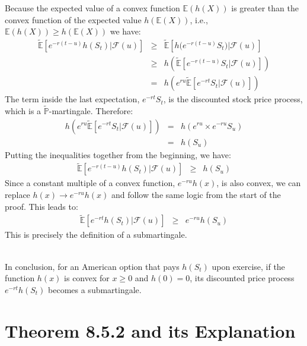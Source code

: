 \documentclass[uplatex,a4j,12pt,dvipdfmx]{jsarticle}
\begin{document}
Because the expected value of a convex function $\mathbb{E}(h(X))$ is greater than the convex function of the expected value $h(\mathbb{E}(X))$, i.e.,
$
	\mathbb{E}(h(X))
	\geq
	h(\mathbb{E}(X))
$
we have:
%
%
\begin{eqnarray*}
	\tilde{\mathbb{E}} \left[
		e^{-r(t-u)} h(S_{t})
		\Big| \mathcal{F}(u)
		\right]
	&\geq&
	\tilde{\mathbb{E}} \left[
		h \Big( e^{-r(t-u)} S_{t} \Big)
		\Big|
		\mathcal{F}(u) \right]
	\\
	&\geq&
	h \left(
	\tilde{\mathbb{E}} \left[
		e^{-r(t-u)} S_{t}
		\Big|
		\mathcal{F}(u) \right]
	\right)
	\\
	&=&
	h \left(
	e^{ru}
	\tilde{\mathbb{E}} \left[
		e^{-rt} S_{t}
		\Big|
		\mathcal{F}(u) \right]
	\right)
\end{eqnarray*}
%
%
The term inside the last expectation, $e^{-rt} S_t$, is the discounted stock price process, which is a $\tilde{\mathbb{P}}$-martingale. Therefore:
%
%
\begin{eqnarray*}
	h \left(
	e^{ru}
	\tilde{\mathbb{E}} \left[
		e^{-rt} S_{t}
		\Big|
		\mathcal{F}(u) \right]
	\right)
	&=&
	h \left(
	e^{ru}
	\times
	e^{-ru} S_{u}
	\right)
	\\ &=&
	h(S_{u})
\end{eqnarray*}
%
%
Putting the inequalities together from the beginning, we have:
%
%
\begin{eqnarray*}
	\tilde{\mathbb{E}} \left[
		e^{-r(t-u)} h(S_{t})
		\Big| \mathcal{F}(u)
		\right]
	&\geq&
	h(S_{u})
\end{eqnarray*}
%
%
Since a constant multiple of a convex function, $e^{-ru}h(x)$, is also convex, we can replace $h(x) \to e^{-ru}h(x)$ and follow the same logic from the start of the proof. This leads to:
%
%
\begin{eqnarray*}
	\tilde{\mathbb{E}} \left[
		e^{-rt} h(S_{t})
		\Big| \mathcal{F}(u)
		\right]
	&\geq&
	e^{-ru}
	h(S_{u})
\end{eqnarray*}
%
%
This is precisely the definition of a submartingale.

\ \\

In conclusion, for an American option that pays $h(S_t)$ upon exercise, if the function $h(x)$ is convex for $x \geq 0$ and $h(0)=0$, its discounted price process $e^{-rt} h(S_t)$ becomes a submartingale.

\section{Theorem 8.5.2\cite{Shreve2004} and its Explanation}
\end{document}
